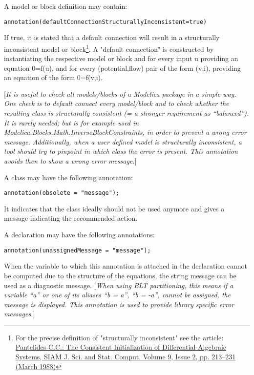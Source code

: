 A model or block definition may contain:
\begin{lstlisting}[language=modelica]
  annotation(defaultConnectionStructurallyInconsistent=true)
\end{lstlisting}

If true, it is stated that a default connection will result in a
structurally inconsistent model or block\footnote{For the precise
  definition of "structurally inconsistent" see the article:
  \href{http://epubs.siam.org/doi/abs/10.1137/0909014}{Pantelides C.C.:
  The Consistent Initialization of Differential-Algebraic Systems, SIAM
  J. Sci. and Stat. Comput. Volume 9, Issue 2, pp. 213--231 (March
  1988)}}. A "default connection" is constructed by instantiating the
respective model or block and for every input u providing an equation
0=f(u), and for every (potential,flow) pair of the form (v,i), providing
an equation of the form 0=f(v,i).

{[}\emph{It is useful to check all models/blocks of a Modelica package
in a simple way. One check is to default connect every model/block and
to check whether the resulting class is structurally consistent (= a
stronger requirement as ``balanced''). It is rarely needed; but is for
example used in Modelica.Blocks.Math.InverseBlockConstraints, in order
to prevent a wrong error message. Additionally, when a user defined
model is structurally inconsistent, a tool should try to pinpoint in
which class the error is present. This annotation avoids then to show a
wrong error message.}{]}

A class may have the following annotation:
\begin{lstlisting}[language=modelica]
  annotation(obsolete = "message");
\end{lstlisting}

It indicates that the class ideally should not be used anymore and gives
a message indicating the recommended action.

A declaration may have the following annotations:
\begin{lstlisting}[language=modelica]
  annotation(unassignedMessage = "message");
\end{lstlisting}

When the variable to which this annotation is attached in the
declaration cannot be computed due to the structure of the equations,
the string message can be used as a diagnostic message. {[}\emph{When
using BLT partitioning, this means if a variable ``a'' or one of its
aliases ``b = a'', ``b = -a'', cannot be assigned, the message is
displayed. This annotation is used to provide library specific error
messages.}{]}

